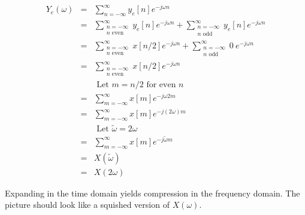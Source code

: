 \documentclass[11pt]{article}
\begin{document}
\begin{eqnarray*}
Y_e(\omega) &=& \sum_{n=-\infty}^\infty y_e[n]e^{-j\omega n} \\
&=& \sum_{\substack{n=-\infty \\ n \text{ even}}}^\infty y_e[n]e^{-j\omega n} + \sum_{\substack{n=-\infty \\ n \text{ odd}}}^\infty y_e[n]e^{-j\omega n} \\
&=& \sum_{\substack{n=-\infty \\ n \text{ even}}}^\infty x[n/2]e^{-j\omega n} + \sum_{\substack{n=-\infty \\ n \text{ odd}}}^\infty 0\ e^{-j\omega n} \\
&=& \sum_{\substack{n=-\infty \\ n \text{ even}}}^\infty x[n/2]e^{-j\omega n}\\
&& \text{ Let } m=n/2 \text{ for even } n \\
&=& \sum_{m=-\infty}^\infty x[m]e^{-j\omega 2m}\\
&=& \sum_{m=-\infty}^\infty x[m]e^{-j(2 \omega) m}\\
&& \text{ Let } \tilde{\omega}=2\omega \\
&=& \sum_{m=-\infty}^\infty x[m]e^{-j\tilde{\omega} m}\\
&=& X(\tilde{\omega})\\
&=& X(2\omega)
\end{eqnarray*}

Expanding in the time domain yields compression in the frequency domain. The picture should look like a squished version of $X(\omega)$.
\end{document}
